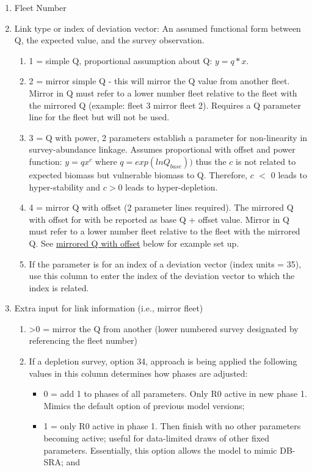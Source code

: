 \begin{enumerate}
	\item Fleet Number
	\item Link type or index of deviation vector: An assumed functional form between Q, the expected value, and the survey observation.
	\begin{enumerate}
		\item 1 = simple Q, proportional assumption about Q: $y=q*x$.
		\item 2 = mirror simple Q - this will mirror the Q value from another fleet. Mirror in Q must refer to a lower number fleet relative to the fleet with the mirrored Q (example: fleet 3 mirror fleet 2). Requires a Q parameter line for the fleet but will not be used.
		\item 3 = Q with power, 2 parameters establish a parameter for non-linearity in survey-abundance linkage.  Assumes proportional with offset and power function: $y=qx^c$ where $q = exp(lnQ_{base}))$ thus the $c$ is not related to expected biomass but vulnerable biomass to Q.  Therefore, $c$ $<$ 0 leads to hyper-stability and $c > 0$ leads to hyper-depletion.
		\item 4 = mirror Q with offset (2 parameter lines required). The mirrored Q with offset for with be reported as base Q + offset value. Mirror in Q must refer to a lower number fleet relative to the fleet with the mirrored Q. See \hyperlink{MirrorQoffset}{mirrored Q with offset} below for example set up.
		\item If the parameter is for an index of a deviation vector (index units = 35), use this column to enter the index of the deviation vector to which the index is related.
	\end{enumerate}
	\item Extra input for link information (i.e., mirror fleet)
	\begin{enumerate}
		\item >0 = mirror the Q from another (lower numbered survey designated by referencing the fleet number)
		\item If a depletion survey, option 34, approach is being applied the following values in this column determines how phases are adjusted:
		\begin{itemize}
			\item 0 = add 1 to phases of all parameters. Only R0 active in new phase 1. Mimics the default option of previous model versions;
			\item 1 = only R0 active in phase 1. Then finish with no other parameters becoming active; useful for data-limited draws of other fixed parameters.  Essentially, this option allows the model to mimic DB-SRA; and

\end{itemize}
\end{enumerate}
\end{enumerate}
